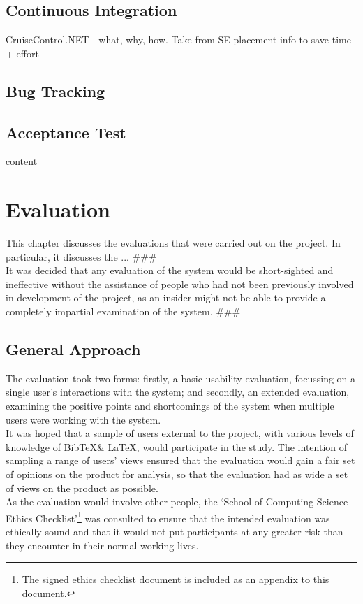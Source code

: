 \documentclass{l4proj}
\newcommand{\BibTeX}{B{\sc ib}\TeX}
\newcommand{\bibtex}{\BibTeX}
\newcommand{\revisit}{\#\#\#}
\begin{document}
\section{Continuous Integration}
\label{continuousIntegration}
CruiseControl.NET - what, why, how. Take from SE placement info to save time + effort

\section{Bug Tracking}


\section{Acceptance Test}
content

\chapter{Evaluation}
\label{eval}
This chapter discusses the evaluations that were carried out on the project.  In particular, it discusses the ... \revisit \\

It was decided that any evaluation of the system would be short-sighted and ineffective without the assistance of people who had not been previously involved in development of the project, as an insider might not be able to provide a completely impartial examination of the system. \revisit

\section{General Approach}
The evaluation took two forms: firstly, a basic usability evaluation, focussing on a single user's interactions with the system; and secondly, an extended evaluation, examining the positive points and shortcomings of the system when multiple users were working with the system.\\
It was hoped that a sample of users external to the project, with various levels of knowledge of \bibtex \& \LaTeX, would participate in the study. The intention of sampling a range of users' views ensured that the evaluation would gain a fair set of opinions on the product for analysis, so that the evaluation had as wide a set of views on the product as possible. \\

As the evaluation would involve other people, the `School of Computing Science Ethics Checklist'\footnote{The signed ethics checklist document is included as an appendix to this document.} was consulted to ensure that the intended evaluation was ethically sound and that it would not put participants at any greater risk than they encounter in their normal working lives.\\
\end{document}
